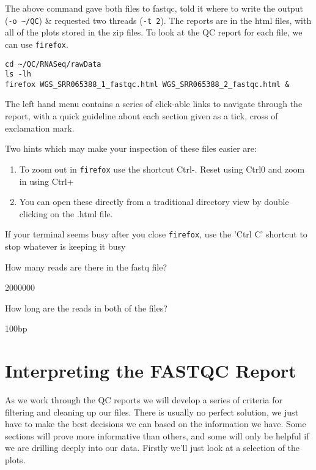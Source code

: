 \begin{steps}
The above command gave both files to fastqc, told it where to write the output (\texttt{-o \~{}/QC}) \& requested two threads (\texttt{-t 2}).
The reports are in the html files, with all of the plots stored in the zip files.
To look at the QC report for each file, we can use \texttt{firefox}.
\begin{lstlisting}
cd ~/QC/RNASeq/rawData
ls -lh
firefox WGS_SRR065388_1_fastqc.html WGS_SRR065388_2_fastqc.html &
\end{lstlisting}
The left hand menu contains a series of click-able links to navigate through the report, with a quick guideline about each section given as a tick, cross of exclamation mark.
\end{steps}

\begin{note}
Two hints which may make your inspection of these files easier are:
\begin{enumerate}
	\item To zoom out in \texttt{firefox} use the shortcut Ctrl-. Reset using Ctrl0 and zoom in using Ctrl+
	\item You can open these directly from a traditional directory view by double clicking on the .html file.
\end{enumerate}
If your terminal seems busy after you close \texttt{firefox}, use the 'Ctrl C' shortcut to stop whatever is keeping it busy
\end{note}

\begin{questions}
How many reads are there in the fastq file?\\
\begin{answer}
  2000000 \\
\end{answer}
How long are the reads in both of the files?\\
\begin{answer}
  100bp \\
\end{answer}
\end{questions}

\section{Interpreting the FASTQC Report}
\begin{note}
As we work through the QC reports we will develop a series of criteria for filtering and cleaning up our files.
There is usually no perfect solution, we just have to make the best decisions we can based on the information we have.
Some sections will prove more informative than others, and some will only be helpful if we are drilling deeply into our data.
Firstly we'll just look at a selection of the plots.
\end{note}


